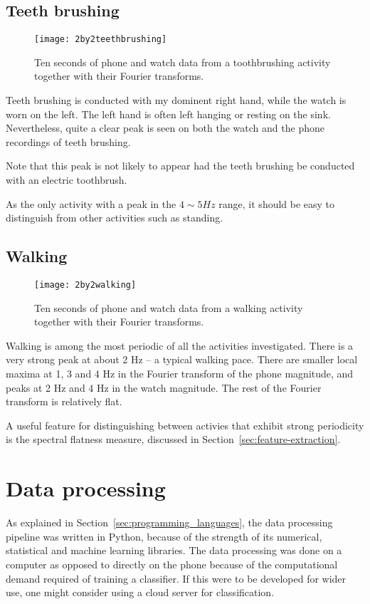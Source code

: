     \subsection{Teeth brushing}
      \begin{figure}[!th]
        \centering
        \texttt{[image: 2by2teethbrushing]}
        \caption{Ten seconds of phone and watch data from a toothbrushing activity together with their Fourier transforms.}
        \label{fig:2by2teethbrushing}
      \end{figure}
      
      Teeth brushing is conducted with my dominent right hand, while the watch is worn on the left. The left hand is often left hanging or resting on the sink. Nevertheless, quite a clear peak is seen on both the watch and the phone recordings of teeth brushing.
      
      Note that this peak is not likely to appear had the teeth brushing be conducted with an electric toothbrush.
      
      As the only activity with a peak in the $4 \sim 5 \si{Hz}$ range, it should be easy to distinguish from other activities such as standing.
    \pagebreak[4]
    \subsection{Walking}
      \begin{figure}[!th]
        \centering
        \texttt{[image: 2by2walking]}
        \caption{Ten seconds of phone and watch data from a walking activity together with their Fourier transforms.}
        \label{fig:2by2walking}
      \end{figure}
      
      Walking is among the most periodic of all the activities investigated. There is a very strong peak at about 2 Hz -- a typical walking pace. There are smaller local maxima at 1, 3 and 4 Hz in the Fourier transform of the phone magnitude, and peaks at 2 Hz and 4 Hz in the watch magnitude. The rest of the Fourier transform is relatively flat.
      
      A useful feature for distinguishing between activies that exhibit strong periodicity is the spectral flatness measure, discussed in Section~\ref{sec:feature-extraction}.

  \section{Data processing}
    \label{sec:data-processing}
    As explained in Section~\ref{sec:programming_languages}, the data processing pipeline was written in Python, because of the strength of its numerical, statistical and machine learning libraries. The data processing was done on a computer as opposed to directly on the phone because of the computational demand required of training a classifier. If this were to be developed for wider use, one might consider using a cloud server for classification.
